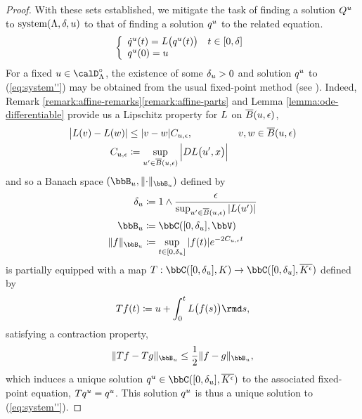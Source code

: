 \begin{proof}
  With these sets established, we mitigate the task of finding a solution $Q^u$ to $\operatorname{system}(\Lambda,\delta,u)$ to that of finding a solution $q^u$ to the related equation.
  \begin{equation}
    \label{eq:system''}
    \left\{\begin{array}{ll}
      \dot q^u(t) = L\big(q^u(t)\big) & t \in [0,\delta] \\
      q^u(0) = u
    \end{array}\right. \\
  \end{equation}
  For a fixed $\momentVar \in \odeSpace^\circ$, the existence of some $\delta_u > 0$ and solution $q^u$ to (\ref{eq:system''}) may be obtained from the usual fixed-point method (see \cite[II.6 Theorem III]{walter1998}).
  Indeed, Remark \ref{remark:affine-remarks}\ref{remark:affine-parts} and Lemma \ref{lemma:ode-differentiable} provide us a Lipschitz property for $L$ on $\overline B(u, \epsilon)$,
  \begin{align*}
    \big|L(v) - L(w)| 
    &\leq |v-w| C_{u,\epsilon},
    & v,w \in \overline B(u,\epsilon) \\
    C_{u,\epsilon} 
    &\coloneqq \sup_{u'\in\overline B(u,\epsilon)} \Big|DL\big(u',x\big)\Big| 
  \end{align*}
  and so a Banach space $(\bbB_\momentVar, \lVert\cdot\rVert_{\bbB_\momentVar})$ defined by
  \begin{align*}
    \delta_\momentVar &\defeq 1 \wedge \frac{\epsilon}{\sup_{\momentVar' \in \overline B(\momentVar, \epsilon)} |\odePart(\momentVar')|} \\
    \bbB_\momentVar &\defeq \cpathSpace{[0,\delta_\momentVar]}{\vecSpace} \\
    \lVert f \rVert_{\bbB_\momentVar} &\defeq \sup_{t \in [0,\delta_\momentVar]} |f(t)| e^{-2C_{\momentVar,\epsilon}t}
  \end{align*}
  is partially equipped with a map $T: \cpathSpace{[0,\delta_\momentVar]}{K} \rightarrow \cpathSpace{[0,\delta_\momentVar]}{\overline{K^\epsilon}}$ defined by
  \begin{equation*}
    Tf(t) \defeq \momentVar + \int_0^t \odePart\big(f(s)\big) \rmd s,
  \end{equation*}
  satisfying a contraction property,
  \begin{equation*}
    \lVert Tf - Tg \rVert_{\bbB_\momentVar}
    \leq \frac{1}{2} \lVert f - g \rVert_{\bbB_\momentVar},
  \end{equation*}
  which induces a unique solution $q^\momentVar \in \cpathSpace{[0,\delta_\momentVar]}{\overline{K^\epsilon}}$ to the associated fixed-point equation, $Tq^u = q^u$.
  This solution $q^u$ is thus a unique solution to (\ref{eq:system''}).


\end{proof}
